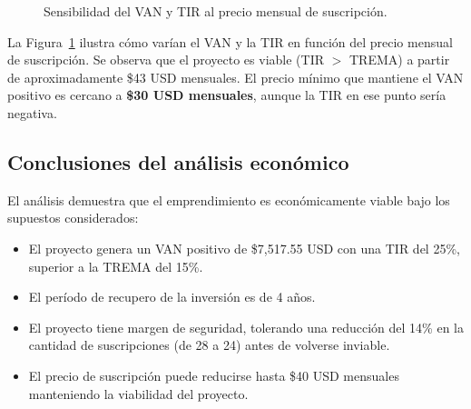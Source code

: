 \documentclass[a4paper, 12pt]{report}
\begin{document}
\begin{figure}[htbp]
  \centering
  \caption{Sensibilidad del VAN y TIR al precio mensual de suscripción.}
  \label{fig:sens-precio}
\end{figure}

La Figura~\ref{fig:sens-precio} ilustra cómo varían el VAN y la TIR en función
del precio mensual de suscripción. Se observa que el proyecto es viable
(TIR $>$ TREMA) a partir de aproximadamente \$43 USD mensuales. El precio
mínimo que mantiene el VAN positivo es cercano a \textbf{\$30 USD mensuales},
aunque la TIR en ese punto sería negativa.

\subsection{Conclusiones del análisis económico}

El análisis demuestra que el emprendimiento es económicamente viable
bajo los supuestos considerados:

\begin{itemize}
  \item El proyecto genera un VAN positivo de \$7,517.55 USD con una
    TIR del 25\%, superior a la TREMA del 15\%.
  \item El período de recupero de la inversión es de 4 años.
  \item El proyecto tiene margen de seguridad, tolerando una reducción
    del 14\% en la cantidad de suscripciones (de 28 a 24) antes de
    volverse inviable.
  \item El precio de suscripción puede reducirse hasta \$40 USD mensuales
    manteniendo la viabilidad del proyecto.
\end{itemize}
\end{document}
